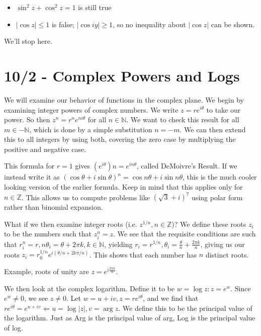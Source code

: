 \documentclass[10pt]{report}
\newcommand{\abs}[1]{\left|#1\right|}
\begin{document}
\begin{itemize}
	\item $\sin^2z + \cos^2z=1$ is still true
	\item $\abs{\cos z} \leq 1$ is false; $\abs{\cos iy} \geq 1$, so no inequality about $\abs{\cos z}$ can be shown.
\end{itemize}

We'll stop here.  

\chapter{10/2 - Complex Powers and Logs}

We will examine our behavior of functions in the complex plane. We begin by examining integer powers of complex numbers. We write $z=re^{i\theta}$ to take our power. So then $z^n = r^ne^{ni\theta}$ for all $n\in\mathbb{N}$. We want to check this result for all $m\in -\mathbb{N}$, which is done by a simple substitution $n=-m$. We can then extend this to all integers by using both, covering the zero case by multiplying the positive and negative case.

This formula for $r=1$ gives $\left( e^{i\theta} \right)n = e^{in\theta}$, called DeMoivre's Result. If we instead write it as $\left( \cos\theta + i\sin\theta \right)^n = \cos n\theta + i\sin n\theta$, this is the much cooler looking version of the earlier formula. Keep in mind that this applies only for $n\in\mathbb{Z}$. This allows us to compute problems like $\left( \sqrt{3} + i \right)^7$ using polar form rather than binomial expansion. 

What if we then examine integer roots (i.e. $z^{1/n}, n \in \mathbb{Z}$)? We define these roots $z_i$ to be the numbers such that $z_i^n=z$. We see that the requisite conditions are such that $r_i^n=r, n\theta_i = \theta + 2\pi k, k \in \mathbb{N}$, yielding $r_i=r^{1/n}, \theta_i=\frac{\theta}{n}+\frac{2\pi k}{n}$, giving us our roots $z_i = r_0^{1/n}e^{i\left( \theta/n+2k\pi/n \right)}$. This shows that each number has $n$ distinct roots.

Example, roots of unity are $z=e^{i\frac{2\pi k}{n}}$. 

We then look at the complex logarithm. Define it to be $w=\log z:z=e^w$. Since $e^w \neq 0$, we see $z \neq 0$. Let $w=u+iv, z=re^{i\theta}$, and we find that $re^{i\theta}=e^{u+iv} \Leftarrow u=\log \abs{z}, v=\arg z$. We define this to be the principal value of the logarithm. Just as Arg is the principal value of arg, Log is the principal value of log. 
\end{document}
